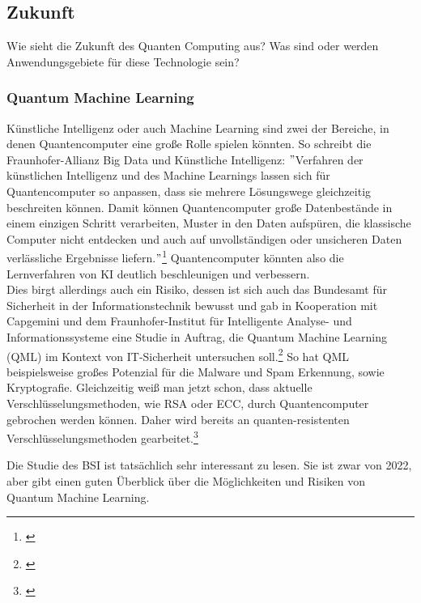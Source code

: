 \subsection{Zukunft}
\label{subsec:zunft}

Wie sieht die Zukunft des Quanten Computing aus?
Was sind oder werden Anwendungsgebiete für diese Technologie sein?\\

\subsubsection{Quantum Machine Learning}
\label{subsubsec:quantum-machine-learning}
Künstliche Intelligenz oder auch Machine Learning sind zwei der Bereiche, in denen Quantencomputer eine große Rolle spielen könnten.
So schreibt die Fraunhofer-Allianz Big Data und Künstliche Intelligenz: \("\)Verfahren der künstlichen Intelligenz und des Machine Learnings lassen sich für Quantencomputer so anpassen, dass sie mehrere Lösungswege gleichzeitig beschreiten können.
Damit können Quantencomputer große Datenbestände in einem einzigen Schritt verarbeiten, Muster in den Daten aufspüren, die klassische Computer nicht entdecken und auch auf unvollständigen oder unsicheren Daten verlässliche Ergebnisse liefern.\("\)\footnote{\cite{tuwien_grenzen_2023}}
Quantencomputer könnten also die Lernverfahren von KI deutlich beschleunigen und verbessern.\\

Dies birgt allerdings auch ein Risiko, dessen ist sich auch das Bundesamt für Sicherheit in der Informationstechnik bewusst und gab in Kooperation mit Capgemini und dem Fraunhofer-Institut für Intelligente Analyse- und Informationssysteme eine Studie in Auftrag, die Quantum Machine Learning (QML) im Kontext von IT-Sicherheit untersuchen soll.\footnote{\cite{BSI_QUITS_2022}}
So hat QML beispielsweise großes Potenzial für die Malware und Spam Erkennung, sowie Kryptografie.
Gleichzeitig weiß man jetzt schon, dass aktuelle Verschlüsselungsmethoden, wie RSA oder ECC, durch Quantencomputer gebrochen werden können.
Daher wird bereits an quanten-resistenten Verschlüsselungsmethoden gearbeitet.\footnote{\cite{BSI_quantum_2022}}\\

\begin{tcolorbox}[title=Kommentar,
    title filled=false,
    colback=cyan!5!white,
    colframe=cyan!75!black]
    Die Studie des BSI ist tatsächlich sehr interessant zu lesen.
    Sie ist zwar von 2022, aber gibt einen guten Überblick über die Möglichkeiten und Risiken von Quantum Machine Learning.
\end{tcolorbox}

